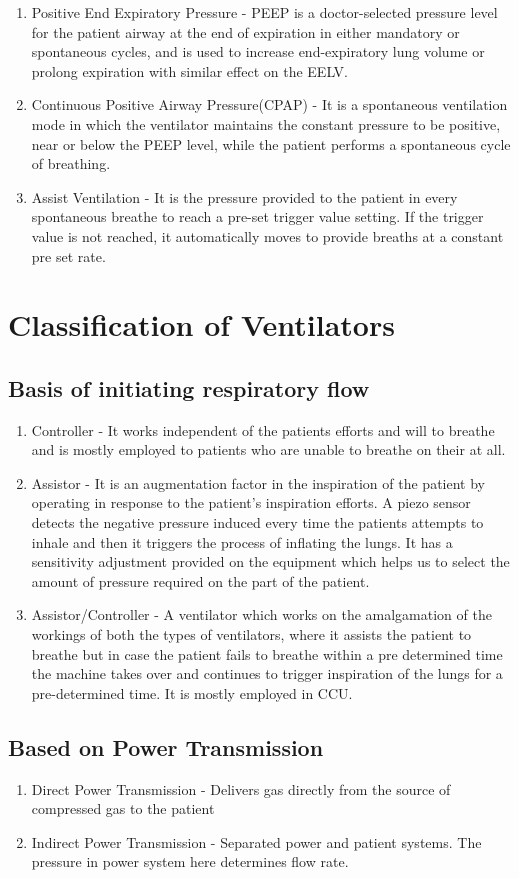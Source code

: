 \documentclass{article}
\begin{document}
\begin{enumerate}
    \item Positive End Expiratory Pressure - PEEP is a doctor-selected pressure level for the patient airway at the end of expiration in either mandatory or spontaneous cycles, and is used to increase end-expiratory lung volume or prolong expiration with similar effect on the EELV.
    \item Continuous Positive Airway Pressure(CPAP) - It is a spontaneous ventilation mode in which the ventilator maintains the constant pressure to be positive, near or below the PEEP level, while the patient performs a spontaneous cycle of breathing.
    \item Assist Ventilation - It is the pressure provided to the patient in every spontaneous breathe to reach a pre-set trigger value setting. If the trigger value is not reached, it automatically moves to provide breaths at a constant pre set rate.
    \end{enumerate}
\section{Classification of Ventilators}
\subsection{Basis of initiating respiratory flow}
\begin{enumerate}
    \item Controller - It works independent of the patients efforts and will to breathe and is mostly employed to patients who are unable to breathe on their at all.
    \item Assistor - It is an augmentation factor in the inspiration of the patient by operating in response to the patient's inspiration efforts. A piezo sensor detects the negative pressure induced every time the patients attempts to inhale and then it triggers the process of inflating the lungs. It has a sensitivity adjustment provided on the equipment which helps us to select the amount of pressure required on the part of the patient.
    \item Assistor/Controller - A ventilator which works on the amalgamation of the workings of both the types of ventilators, where it assists the patient to breathe but in case the patient fails to breathe within a pre determined time the machine takes over and continues to trigger inspiration of the lungs for a pre-determined time. It is mostly employed in CCU.
\end{enumerate}
\subsection{Based on Power Transmission}
\begin{enumerate}
    \item Direct Power Transmission - Delivers gas directly from the source of compressed gas to the patient
    \item Indirect Power Transmission - Separated power and patient systems. The pressure in power system here determines flow rate.
\end{enumerate}
\end{document}
